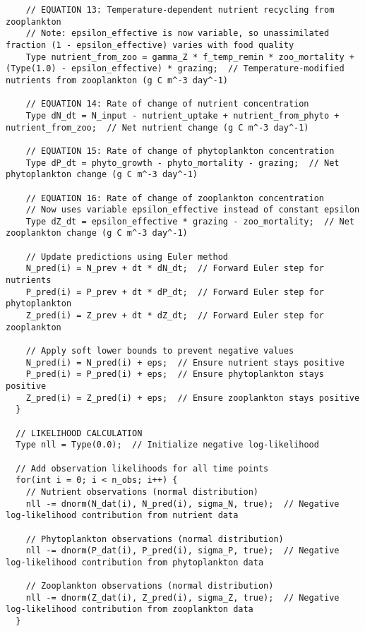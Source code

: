 \begin{lstlisting}
    // EQUATION 13: Temperature-dependent nutrient recycling from zooplankton
    // Note: epsilon_effective is now variable, so unassimilated fraction (1 - epsilon_effective) varies with food quality
    Type nutrient_from_zoo = gamma_Z * f_temp_remin * zoo_mortality + (Type(1.0) - epsilon_effective) * grazing;  // Temperature-modified nutrients from zooplankton (g C m^-3 day^-1)
    
    // EQUATION 14: Rate of change of nutrient concentration
    Type dN_dt = N_input - nutrient_uptake + nutrient_from_phyto + nutrient_from_zoo;  // Net nutrient change (g C m^-3 day^-1)
    
    // EQUATION 15: Rate of change of phytoplankton concentration
    Type dP_dt = phyto_growth - phyto_mortality - grazing;  // Net phytoplankton change (g C m^-3 day^-1)
    
    // EQUATION 16: Rate of change of zooplankton concentration
    // Now uses variable epsilon_effective instead of constant epsilon
    Type dZ_dt = epsilon_effective * grazing - zoo_mortality;  // Net zooplankton change (g C m^-3 day^-1)
    
    // Update predictions using Euler method
    N_pred(i) = N_prev + dt * dN_dt;  // Forward Euler step for nutrients
    P_pred(i) = P_prev + dt * dP_dt;  // Forward Euler step for phytoplankton
    Z_pred(i) = Z_prev + dt * dZ_dt;  // Forward Euler step for zooplankton
    
    // Apply soft lower bounds to prevent negative values
    N_pred(i) = N_pred(i) + eps;  // Ensure nutrient stays positive
    P_pred(i) = P_pred(i) + eps;  // Ensure phytoplankton stays positive
    Z_pred(i) = Z_pred(i) + eps;  // Ensure zooplankton stays positive
  }
  
  // LIKELIHOOD CALCULATION
  Type nll = Type(0.0);  // Initialize negative log-likelihood
  
  // Add observation likelihoods for all time points
  for(int i = 0; i < n_obs; i++) {
    // Nutrient observations (normal distribution)
    nll -= dnorm(N_dat(i), N_pred(i), sigma_N, true);  // Negative log-likelihood contribution from nutrient data
    
    // Phytoplankton observations (normal distribution)
    nll -= dnorm(P_dat(i), P_pred(i), sigma_P, true);  // Negative log-likelihood contribution from phytoplankton data
    
    // Zooplankton observations (normal distribution)
    nll -= dnorm(Z_dat(i), Z_pred(i), sigma_Z, true);  // Negative log-likelihood contribution from zooplankton data
  }
  

\end{lstlisting}
